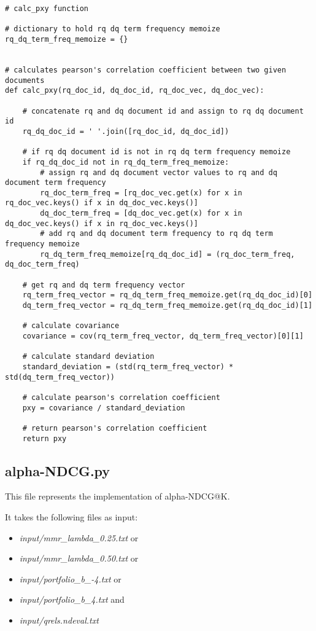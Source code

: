 \documentclass{article} %
\begin{document}
\begin{lstlisting}[style=Python]
# calc_pxy function

# dictionary to hold rq dq term frequency memoize
rq_dq_term_freq_memoize = {}


# calculates pearson's correlation coefficient between two given documents
def calc_pxy(rq_doc_id, dq_doc_id, rq_doc_vec, dq_doc_vec):

    # concatenate rq and dq document id and assign to rq dq document id
    rq_dq_doc_id = ' '.join([rq_doc_id, dq_doc_id])

    # if rq dq document id is not in rq dq term frequency memoize
    if rq_dq_doc_id not in rq_dq_term_freq_memoize:
        # assign rq and dq document vector values to rq and dq document term frequency
        rq_doc_term_freq = [rq_doc_vec.get(x) for x in rq_doc_vec.keys() if x in dq_doc_vec.keys()]
        dq_doc_term_freq = [dq_doc_vec.get(x) for x in dq_doc_vec.keys() if x in rq_doc_vec.keys()]
        # add rq and dq document term frequency to rq dq term frequency memoize
        rq_dq_term_freq_memoize[rq_dq_doc_id] = (rq_doc_term_freq, dq_doc_term_freq)

    # get rq and dq term frequency vector
    rq_term_freq_vector = rq_dq_term_freq_memoize.get(rq_dq_doc_id)[0]
    dq_term_freq_vector = rq_dq_term_freq_memoize.get(rq_dq_doc_id)[1]

    # calculate covariance
    covariance = cov(rq_term_freq_vector, dq_term_freq_vector)[0][1]

    # calculate standard deviation
    standard_deviation = (std(rq_term_freq_vector) * std(dq_term_freq_vector))

    # calculate pearson's correlation coefficient
    pxy = covariance / standard_deviation

    # return pearson's correlation coefficient
    return pxy
\end{lstlisting}

\subsection*{alpha-NDCG.py \cite{clarke2008novelty}}

This file represents the implementation of alpha-NDCG@K.

It takes the following files as input:

\begin{itemize}
    \item \textit{input/mmr\_lambda\_0.25.txt} or
    \item \textit{input/mmr\_lambda\_0.50.txt} or
    \item \textit{input/portfolio\_b\_-4.txt} or
    \item \textit{input/portfolio\_b\_4.txt} and
    \item \textit{input/qrels.ndeval.txt}
\end{itemize}
\end{document}

